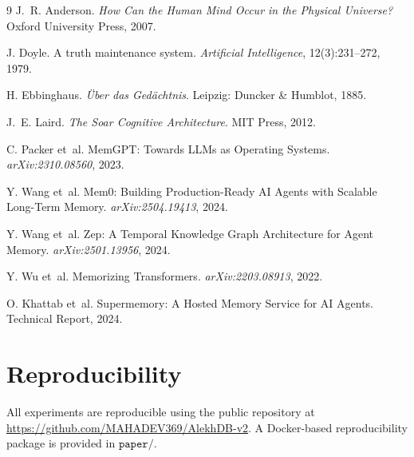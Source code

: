 
\begin{thebibliography}{9}
J.~R. Anderson.
\newblock \textit{How Can the Human Mind Occur in the Physical Universe?}
\newblock Oxford University Press, 2007.

J. Doyle.
\newblock A truth maintenance system.
\newblock \textit{Artificial Intelligence}, 12(3):231--272, 1979.

H. Ebbinghaus.
\newblock \textit{\"Uber das Ged\"achtnis}.
\newblock Leipzig: Duncker \& Humblot, 1885.

J.~E. Laird.
\newblock \textit{The Soar Cognitive Architecture}.
\newblock MIT Press, 2012.

C. Packer et~al.
\newblock MemGPT: Towards LLMs as Operating Systems.
\newblock \textit{arXiv:2310.08560}, 2023.

Y. Wang et~al.
\newblock Mem0: Building Production-Ready AI Agents with Scalable Long-Term Memory.
\newblock \textit{arXiv:2504.19413}, 2024.

Y. Wang et~al.
\newblock Zep: A Temporal Knowledge Graph Architecture for Agent Memory.
\newblock \textit{arXiv:2501.13956}, 2024.

Y. Wu et~al.
\newblock Memorizing Transformers.
\newblock \textit{arXiv:2203.08913}, 2022.

O. Khattab et~al.
\newblock Supermemory: A Hosted Memory Service for AI Agents.
\newblock Technical Report, 2024.
\end{thebibliography}

\appendix

\section{Reproducibility}

All experiments are reproducible using the public repository at \url{https://github.com/MAHADEV369/AlekhDB-v2}. A Docker-based reproducibility package is provided in $\texttt{paper/}$.

